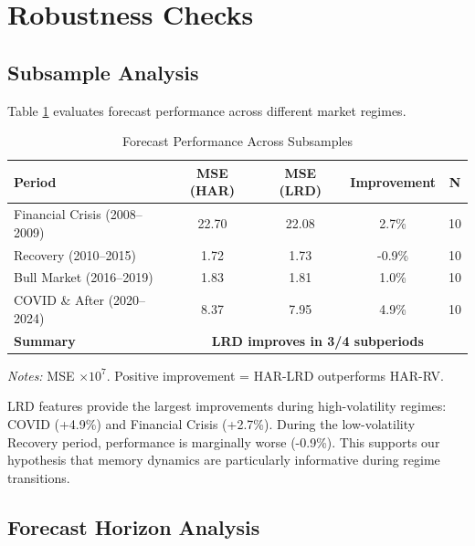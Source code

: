 \documentclass[12pt,a4paper]{article}
\begin{document}
\section{Robustness Checks}
\label{sec:robustness}

\subsection{Subsample Analysis}

Table \ref{tab:subsamples} evaluates forecast performance across different market regimes.

\begin{table}[H]
\centering
\caption{Forecast Performance Across Subsamples}
\label{tab:subsamples}
\small
\begin{tabular}{lcccc}
\toprule
Period & MSE (HAR) & MSE (LRD) & Improvement & N \\
\midrule
Financial Crisis (2008--2009) & 22.70 & 22.08 & 2.7\% & 10 \\
Recovery (2010--2015) & 1.72 & 1.73 & -0.9\% & 10 \\
Bull Market (2016--2019) & 1.83 & 1.81 & 1.0\% & 10 \\
COVID \& After (2020--2024) & 8.37 & 7.95 & 4.9\% & 10 \\
\midrule
\textbf{Summary} & \multicolumn{4}{c}{\textbf{LRD improves in 3/4 subperiods}} \\
\bottomrule
\end{tabular}
\begin{tablenotes}\small
\item \textit{Notes:} MSE $\times 10^7$. Positive improvement = HAR-LRD outperforms HAR-RV.
\end{tablenotes}
\end{table}
\noindent
LRD features provide the largest improvements during high-volatility regimes: COVID (+4.9\%) and Financial Crisis (+2.7\%). During the low-volatility Recovery period, performance is marginally worse (-0.9\%). This supports our hypothesis that memory dynamics are particularly informative during regime transitions.

\subsection{Forecast Horizon Analysis}
\end{document}
